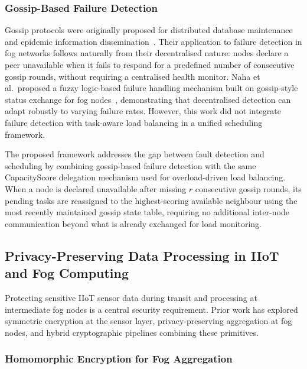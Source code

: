 \documentclass[conference]{IEEEtran}
\begin{document}
\subsubsection{Gossip-Based Failure Detection}

Gossip protocols were originally proposed for distributed database maintenance and epidemic information dissemination~\cite{demers1988epidemic}. Their application to failure detection in fog networks follows naturally from their decentralised nature: nodes declare a peer unavailable when it fails to respond for a predefined number of consecutive gossip rounds, without requiring a centralised health monitor. Naha et al.\ proposed a fuzzy logic-based failure handling mechanism built on gossip-style status exchange for fog nodes~\cite{naha2021}, demonstrating that decentralised detection can adapt robustly to varying failure rates. However, this work did not integrate failure detection with task-aware load balancing in a unified scheduling framework.

The proposed framework addresses the gap between fault detection and scheduling by combining gossip-based failure detection with the same CapacityScore delegation mechanism used for overload-driven load balancing. When a node is declared unavailable after missing $r$ consecutive gossip rounds, its pending tasks are reassigned to the highest-scoring available neighbour using the most recently maintained gossip state table, requiring no additional inter-node communication beyond what is already exchanged for load monitoring.

\subsection{Privacy-Preserving Data Processing in IIoT and Fog Computing}

Protecting sensitive IIoT sensor data during transit and processing at intermediate fog nodes is a central security requirement. Prior work has explored symmetric encryption at the sensor layer, privacy-preserving aggregation at fog nodes, and hybrid cryptographic pipelines combining these primitives.

\subsubsection{Homomorphic Encryption for Fog Aggregation}
\end{document}
